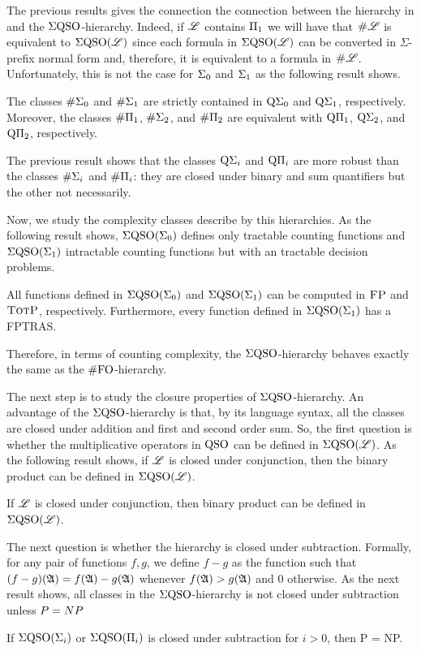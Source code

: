 The previous results gives the connection the connection between the hierarchy in \cite{SalujaST95} and the $\Sigma{\rm QSO}$-hierarchy. 
Indeed, if $\mathscr{L}$ contains $\Pi_{1}$ we will have that $\text{\sc \#} \mathscr{L}$ is equivalent to $\Sigma{\rm QSO}(\mathscr{L})$ since each formula in $\Sigma{\rm QSO}(\mathscr{L})$ can be converted in $\Sigma$-prefix normal form and, therefore, it is equivalent to a formula in $\text{\sc \#} \mathscr{L}$. 
Unfortunately, this is not the case for $\Sigma_{0}$ and $\Sigma_{1}$ as the following result shows.
\begin{proposition}
	The classes $\#\Sigma_{0}$ and $\#\Sigma_{1}$ are strictly contained in $\operatorname{Q}\!\Sigma_{0}$ and $\operatorname{Q}\!\Sigma_{1}$, respectively. Moreover, the classes $\#\Pi_{1}$, $\#\Sigma_{2}$, and $\#\Pi_{2}$ are equivalent with $\operatorname{Q}\!\Pi_{1}$, $\operatorname{Q}\!\Sigma_{2}$, and $\operatorname{Q}\!\Pi_{2}$, respectively.
\end{proposition}
The previous result shows that the classes $\operatorname{Q}\!\Sigma_{i}$ and $\operatorname{Q}\!\Pi_{i}$ are more robust than the classes $\#\Sigma_{i}$ and $\#\Pi_{i}$: they are closed under binary and sum quantifiers but the other not necessarily. 

Now, we study the complexity classes describe by this hierarchies. As the following result shows, $\Sigma{\rm QSO}(\Sigma_{0})$ defines only tractable counting functions and $\Sigma{\rm QSO}(\Sigma_{1})$ intractable counting functions but with an tractable decision problems. 
\begin{proposition}
All functions defined in $\Sigma{\rm QSO}(\Sigma_{0})$ and $\Sigma{\rm QSO}(\Sigma_{1})$ can be computed in $\text{\sc FP}$ and $\text{\sc TotP}$, respectively. Furthermore, every function defined in $\Sigma{\rm QSO}(\Sigma_{1})$ has a FPTRAS.
\end{proposition}
Therefore, in terms of counting complexity, the $\Sigma{\rm QSO}$-hierarchy behaves exactly the same as the $\#{\rm FO}$-hierarchy.

The next step is to study the closure properties of $\Sigma{\rm QSO}$-hierarchy. 
An advantage of the $\Sigma{\rm QSO}$-hierarchy is that, by its language syntax, all the classes are closed under addition and first and second order sum.
So, the first question is whether the multiplicative operators in ${\rm QSO}$ can be defined in $\Sigma{\rm QSO}(\mathscr{L})$. As the following result shows, if $\mathscr{L}$ is closed under conjunction, then the binary product can be defined in  $\Sigma{\rm QSO}(\mathscr{L})$.
\begin{theorem}\label{theo:binary-prod}
	If $\mathscr{L}$ is closed under conjunction, then binary product can be defined in $\Sigma{\rm QSO}(\mathscr{L})$.
\end{theorem}
The next question is whether the hierarchy is closed under subtraction. Formally, for any pair of functions $f,g$, we define $f - g$ as the function such that $(f - g)(\mathfrak{A}) = f(\mathfrak{A})-g(\mathfrak{A})$ whenever $f(\mathfrak{A})>g(\mathfrak{A})$ and $0$ otherwise.
As the next result shows, all classes in the $\Sigma{\rm QSO}$-hierarchy is not closed under subtraction unless ${\sc P} = {\sc NP}$
\begin{theorem} \label{sub-pnp}
If $\Sigma{\rm QSO}(\Sigma_{i})$ or $\Sigma{\rm QSO}(\Pi_{i})$ is closed under subtraction for $i > 0$, then {\sc P} = {\sc NP}.
\end{theorem}

